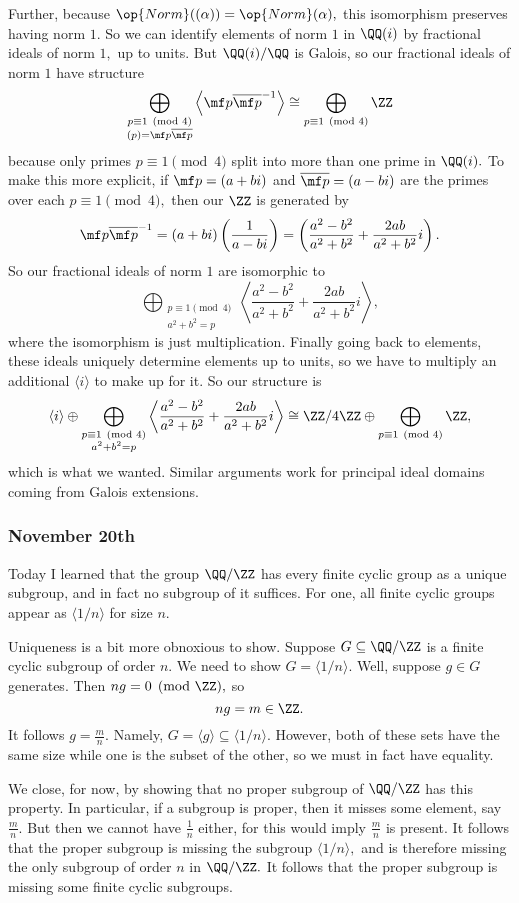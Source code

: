 Further, because $\op{Norm}((\alpha))=\op{Norm}(\alpha),$ this isomorphism preserves having norm $1.$ So we can identify elements of norm $1$ in $\QQ(i)$ by fractional ideals of norm $1,$ up to units. But $\QQ(i)/\QQ$ is Galois, so our fractional ideals of norm $1$ have structure
\[\bigoplus_{\substack{p\equiv1\pmod4\\(p)=\mf p\overline{\mf p}}}\left\langle\mf p\overline{\mf p}^{-1}\right\rangle\cong\bigoplus_{p\equiv1\pmod4}\ZZ\]
because only primes $p\equiv1\pmod4$ split into more than one prime in $\QQ(i).$ To make this more explicit, if $\mf p=(a+bi)$ and $\overline{\mf p}=(a-bi)$ are the primes over each $p\equiv1\pmod 4,$ then our $\ZZ$ is generated by
\[\mf p\overline{\mf p}^{-1}=(a+bi)\left(\frac1{a-bi}\right)=\left(\frac{a^2-b^2}{a^2+b^2}+\frac{2ab}{a^2+b^2}i\right).\]
So our fractional ideals of norm $1$ are isomorphic to
\[\bigoplus_{\substack{p\equiv1\pmod4\\a^2+b^2=p}}\left\langle\frac{a^2-b^2}{a^2+b^2}+\frac{2ab}{a^2+b^2}i\right\rangle,\]
where the isomorphism is just multiplication. Finally going back to elements, these ideals uniquely determine elements up to units, so we have to multiply an additional $\langle i\rangle$ to make up for it. So our structure is
\[\langle i\rangle\oplus\bigoplus_{\substack{p\equiv1\pmod4\\a^2+b^2=p}}\left\langle\frac{a^2-b^2}{a^2+b^2}+\frac{2ab}{a^2+b^2}i\right\rangle\cong\ZZ/4\ZZ\oplus\bigoplus_{p\equiv1\pmod4}\ZZ,\]
which is what we wanted. Similar arguments work for principal ideal domains coming from Galois extensions.

\subsubsection{November 20th}
Today I learned that the group $\QQ/\ZZ$ has every finite cyclic group as a unique subgroup, and in fact no subgroup of it suffices. For one, all finite cyclic groups appear as $\langle 1/n\rangle$ for size $n.$

Uniqueness is a bit more obnoxious to show. Suppose $G\subseteq\QQ/\ZZ$ is a finite cyclic subgroup of order $n.$ We need to show $G=\langle1/n\rangle.$ Well, suppose $g\in G$ generates. Then $ng=0\pmod\ZZ,$ so
\[ng=m\in\ZZ.\]
It follows $g=\frac mn.$ Namely, $G=\langle g\rangle\subseteq\langle1/n\rangle.$ However, both of these sets have the same size while one is the subset of the other, so we must in fact have equality.

We close, for now, by showing that no proper subgroup of $\QQ/\ZZ$ has this property. In particular, if a subgroup is proper, then it misses some element, say $\frac mn.$ But then we cannot have $\frac1n$ either, for this would imply $\frac mn$ is present. It follows that the proper subgroup is missing the subgroup $\langle1/n\rangle,$ and is therefore missing the only subgroup of order $n$ in $\QQ/\ZZ.$ It follows that the proper subgroup is missing some finite cyclic subgroups.

